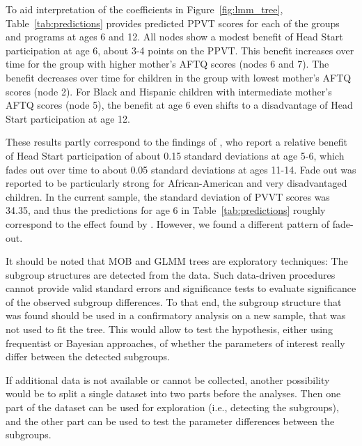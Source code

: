 \documentclass[doc,floatsintext,natbib]{apa7}
\begin{document}
To aid interpretation of the coefficients in Figure~\ref{fig:lmm_tree}, Table~\ref{tab:predictions} provides predicted PPVT scores for each of the groups and programs at ages 6 and 12. All nodes show a modest benefit of Head Start participation at age 6, about 3-4 points on the PPVT. This benefit increases over time for the group with higher mother's AFTQ scores (nodes 6 and 7). The benefit decreases over time for children in the group with lowest mother's AFTQ scores (node 2). For Black and Hispanic children with intermediate mother's AFTQ scores (node 5), the benefit at age 6 even shifts to a disadvantage of Head Start participation at age 12. 

These results partly correspond to the findings of \cite{Demi09}, who report a relative benefit of Head Start participation of about 0.15 standard deviations at age 5-6, which fades out over time to about 0.05 standard deviations at ages 11-14. Fade out was reported to be particularly strong for African-American and very disadvantaged children. In the current sample, the standard deviation of PVVT scores was 34.35, and thus the predictions for age 6 in Table~\ref{tab:predictions} roughly correspond to the effect found by \cite{Demi09}. However, we found a different pattern of fade-out.

It should be noted that MOB and GLMM trees are exploratory techniques: The subgroup structures are detected from the data. Such data-driven procedures cannot provide valid standard errors and significance tests to evaluate significance of the observed subgroup differences. To that end, the subgroup structure that was found should be used in a confirmatory analysis on a new sample, that was not used to fit the tree. This would allow to test the hypothesis, either using frequentist or Bayesian approaches, of whether the parameters of interest really differ between the detected subgroups. 

If additional data is not available or cannot be collected, another possibility would be to split a single dataset into two parts before the analyses. Then one part of the dataset can be used for exploration (i.e., detecting the subgroups), and the other part can be used to test the parameter differences between the subgroups. 
\end{document}
